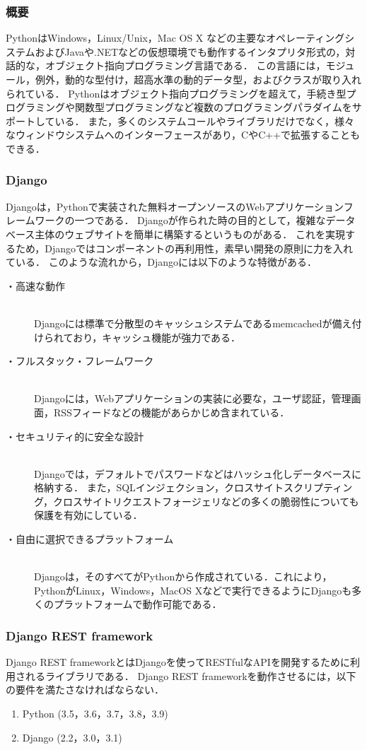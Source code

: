 \subsubsection{概要}
Python\cite{python}はWindows，Linux/Unix，Mac OS X などの主要なオペレーティングシステムおよびJavaや.NETなどの仮想環境でも動作するインタプリタ形式の，対話的な，オブジェクト指向プログラミング言語である．
この言語には，モジュール，例外，動的な型付け，超高水準の動的データ型，およびクラスが取り入れられている．
Pythonはオブジェクト指向プログラミングを超えて，手続き型プログラミングや関数型プログラミングなど複数のプログラミングパラダイムをサポートしている．
また，多くのシステムコールやライブラリだけでなく，様々なウィンドウシステムへのインターフェースがあり，C\cite{Clang}やC++\cite{cplusplus}で拡張することもできる．

\subsubsection{Django}
Django\cite{Django}は，Pythonで実装された無料オープンソースのWebアプリケーションフレームワークの一つである．
Djangoが作られた時の目的として，複雑なデータベース主体のウェブサイトを簡単に構築するというものがある．
これを実現するため，Djangoではコンポーネントの再利用性，素早い開発の原則に力を入れている．
このような流れから，Djangoには以下のような特徴がある．

\begin{description}
    \item[・高速な動作]\mbox{}\\
        Djangoには標準で分散型のキャッシュシステムであるmemcached\cite{memcached}が備え付けられており，キャッシュ機能が強力である．
    \item[・フルスタック・フレームワーク]\mbox{}\\
        Djangoには，Webアプリケーションの実装に必要な，ユーザ認証，管理画面，RSSフィードなどの機能があらかじめ含まれている．
    \item[・セキュリティ的に安全な設計]\mbox{}\\
        Djangoでは，デフォルトでパスワードなどはハッシュ化しデータベースに格納する．
        また，SQLインジェクション，クロスサイトスクリプティング，クロスサイトリクエストフォージェリなどの多くの脆弱性についても保護を有効にしている．
    \item[・自由に選択できるプラットフォーム]\mbox{}\\
        Djangoは，そのすべてがPythonから作成されている．これにより，PythonがLinux，Windows，MacOS Xなどで実行できるようにDjangoも多くのプラットフォームで動作可能である．
\end{description}

\subsubsection{Django REST framework}
Django REST framework\cite{drf}とはDjangoを使ってRESTfulなAPIを開発するために利用されるライブラリである．
Django REST frameworkを動作させるには，以下の要件を満たさなければならない．
\begin{enumerate}
    \item Python (3.5，3.6，3.7，3.8，3.9)
    \item Django (2.2，3.0，3.1)
\end{enumerate}


